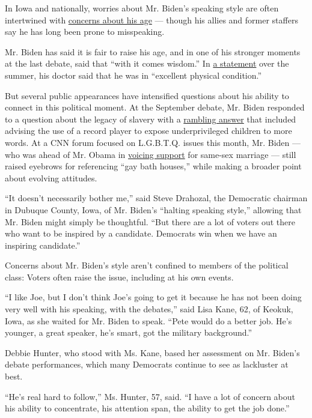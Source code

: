 In Iowa and nationally, worries about Mr. Biden's speaking style are
often intertwined with
\href{https://www.nytimes.com/2019/07/29/us/politics/joe-biden-age.html}{concerns
about his age} --- though his allies and former staffers say he has long
been prone to misspeaking.

Mr. Biden has said it is fair to raise his age, and in one of his
stronger moments at the last debate, said that ``with it comes wisdom.''
In
\href{https://www.nytimes.com/2019/07/29/us/politics/joe-biden-age.html}{a
statement} over the summer, his doctor said that he was in ``excellent
physical condition.''

But several public appearances have intensified questions about his
ability to connect in this political moment. At the September debate,
Mr. Biden responded to a question about the legacy of slavery with a
\href{https://www.nytimes.com/2019/09/12/us/politics/biden-record-player.html}{rambling
answer} that included advising the use of a record player to expose
underprivileged children to more words. At a CNN forum focused on
L.G.B.T.Q. issues this month, Mr. Biden --- who was ahead of Mr. Obama
in
\href{https://www.nytimes.com/2012/05/07/us/politics/biden-expresses-support-for-same-sex-marriages.html}{voicing
support} for same-sex marriage --- still raised eyebrows for referencing
``gay bath houses,'' while making a broader point about evolving
attitudes.

``It doesn't necessarily bother me,'' said Steve Drahozal, the
Democratic chairman in Dubuque County, Iowa, of Mr. Biden's ``halting
speaking style,'' allowing that Mr. Biden might simply be thoughtful.
``But there are a lot of voters out there who want to be inspired by a
candidate. Democrats win when we have an inspiring candidate.''

Concerns about Mr. Biden's style aren't confined to members of the
political class: Voters often raise the issue, including at his own
events.

``I like Joe, but I don't think Joe's going to get it because he has not
been doing very well with his speaking, with the debates,'' said Lisa
Kane, 62, of Keokuk, Iowa, as she waited for Mr. Biden to speak. ``Pete
would do a better job. He's younger, a great speaker, he's smart, got
the military background.''

Debbie Hunter, who stood with Ms. Kane, based her assessment on Mr.
Biden's debate performances, which many Democrats continue to see as
lackluster at best.

``He's real hard to follow,'' Ms. Hunter, 57, said. ``I have a lot of
concern about his ability to concentrate, his attention span, the
ability to get the job done.''

